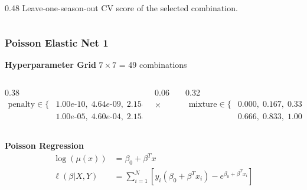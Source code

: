 \documentclass{beamer}
\begin{document}
\begin{frame}
\begin{columns}[T]
\begin{column}{0.48\textwidth}
      \vspace{0.4em}
      \scriptsize
      Leave-one-season-out CV score of the selected combination.
    \end{column}

  \end{columns}

\end{frame}


\begin{frame}
    \frametitle{Poisson Elastic Net 1}

    \small

    \textbf{Hyperparameter Grid} $7 \times 7$ = 49 combinations

    {\footnotesize
    \begin{columns}[c]
        \begin{column}{0.38\textwidth}
            \begin{align*}
                \text{penalty} \in \{&
                1.00e\text{-}10,\;
                4.64e\text{-}09,\;
                2.15e\text{-}07,\\
                &1.00e\text{-}05,\;
                4.60e\text{-}04,\;
                2.15e\text{-}02,\;
                1.00
                \}
            \end{align*}
        \end{column}

        \begin{column}{0.06\textwidth}
            \centering
            $\times$
        \end{column}

        \begin{column}{0.32\textwidth}
            \begin{align*}
                \text{mixture} \in \{&
                0.000,\;0.167,\;0.333,\;0.500,\\
                &0.666,\;0.833,\;1.000
                \}
            \end{align*}
        \end{column}
    \end{columns}
    }

    \textbf{Poisson Regression}
    \vspace{-.2cm}
    \begin{align*}
        \log(\mu(x)) &= \beta_0 + \beta^T x\\
        \ell(\beta|X,Y) &= \sum_{i=1}^N
        \left[
        y_i(\beta_0+\beta^Tx_i)
        - e^{\beta_0+\beta^Tx_i}
        \right]
    \end{align*}


\end{frame}
\end{document}
